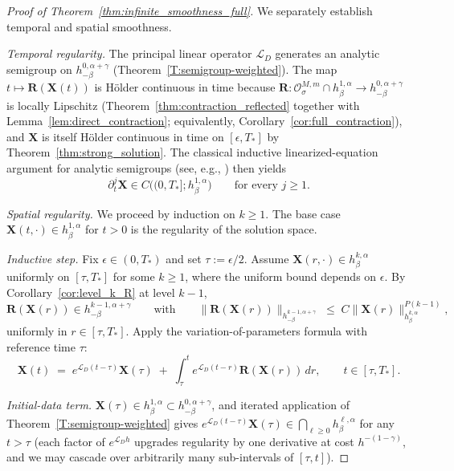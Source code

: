 \documentclass{amsart}
\begin{document}
\begin{proof}[Proof of Theorem~\ref{thm:infinite_smoothness_full}]
We separately establish temporal and spatial smoothness.

\emph{Temporal regularity.} The principal linear operator $\mathcal{L}_D$ generates an analytic semigroup on $h^{0,\alpha+\gamma}_{-\beta}$ (Theorem~\ref{T:semigroup-weighted}). The map $t \mapsto \mathbf{R}(\mathbf{X}(t))$ is Hölder continuous in time because $\mathbf{R}:\mathcal{O}^{M,m}_\sigma \cap h^{1,\alpha}_\beta \to h^{0,\alpha+\gamma}_{-\beta}$ is locally Lipschitz (Theorem~\ref{thm:contraction_reflected} together with Lemma~\ref{lem:direct_contraction}; equivalently, Corollary~\ref{cor:full_contraction}), and $\mathbf{X}$ is itself Hölder continuous in time on $[\epsilon, T_*]$ by Theorem~\ref{thm:strong_solution}. The classical inductive linearized-equation argument for analytic semigroups (see, e.g., \cite[Ch.~4]{lunardi1995analytic}) then yields
\[
\partial_t^j\mathbf{X} \in C\bigl((0,T_*]; h^{1,\alpha}_\beta\bigr) \qquad\text{for every } j \ge 1.
\]

\emph{Spatial regularity.} We proceed by induction on $k \ge 1$. The base case $\mathbf{X}(t, \cdot) \in h^{1,\alpha}_\beta$ for $t > 0$ is the regularity of the solution space.

\emph{Inductive step.} Fix $\epsilon \in (0, T_*)$ and set $\tau := \epsilon/2$. Assume $\mathbf{X}(r, \cdot) \in h^{k,\alpha}_\beta$ uniformly on $[\tau, T_*]$ for some $k \ge 1$, where the uniform bound depends on $\epsilon$. By Corollary~\ref{cor:level_k_R} at level $k - 1$,
\[
\mathbf{R}(\mathbf{X}(r)) \in h^{k-1,\alpha+\gamma}_{-\beta}
\qquad\text{with}\qquad
\|\mathbf{R}(\mathbf{X}(r))\|_{h^{k-1,\alpha+\gamma}_{-\beta}}
\;\le\; C\|\mathbf{X}(r)\|_{h^{k,\alpha}_\beta}^{P(k-1)},
\]
uniformly in $r \in [\tau, T_*]$.  Apply the variation-of-parameters formula with reference time $\tau$:
\[
\mathbf{X}(t) \;=\; e^{\mathcal{L}_D(t-\tau)}\mathbf{X}(\tau)
  \;+\;\int_\tau^t e^{\mathcal{L}_D(t-r)}\mathbf{R}(\mathbf{X}(r))\,dr,
\qquad t \in [\tau, T_*].
\]

\emph{Initial-data term.} $\mathbf{X}(\tau) \in h^{1,\alpha}_\beta \subset h^{0,\alpha+\gamma}_{-\beta}$, and iterated application of Theorem~\ref{T:semigroup-weighted} gives $e^{\mathcal{L}_D(t-\tau)}\mathbf{X}(\tau) \in \bigcap_{\ell \ge 0} h^{\ell,\alpha}_\beta$ for any $t > \tau$ (each factor of $e^{\mathcal{L}_D h}$ upgrades regularity by one derivative at cost $h^{-(1-\gamma)}$, and we may cascade over arbitrarily many sub-intervals of $[\tau, t]$).


\end{proof}
\end{document}
